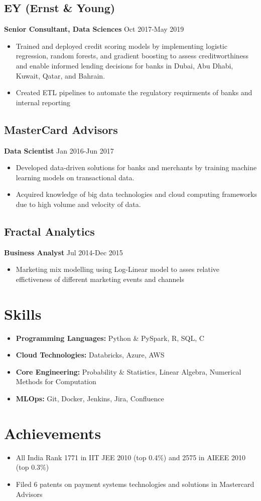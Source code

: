 \documentclass[a4paper,10pt]{article}
\begin{document}
\subsection*{EY (Ernst \& Young)}
\textbf{Senior Consultant, Data Sciences} \hfill Oct 2017-May 2019
\begin{itemize}[leftmargin=*]
    \item  Trained and deployed credit scoring models by implementing logistic regression, random forests, and gradient boosting to assess creditworthiness and enable informed lending decisions for banks in Dubai, Abu Dhabi, Kuwait, Qatar, and Bahrain.
    \item Created ETL pipelines to automate the regulatory requirments of banks and internal reporting 
\end{itemize}

\subsection*{MasterCard Advisors}
\textbf{Data Scientist} \hfill Jan 2016-Jun 2017
\begin{itemize}[leftmargin=*]
    \item Developed data-driven solutions for banks and merchants by training machine learning models on transactional data.
    \item Acquired knowledge of big data technologies and cloud computing frameworks due to high volume and velocity of data.
\end{itemize}

\subsection*{Fractal Analytics}
\textbf{Business Analyst} \hfill Jul 2014-Dec 2015
\begin{itemize}[leftmargin=*]
    \item Marketing mix modelling using Log-Linear model to asses relative effictiveness of different marketing events and channels  
\end{itemize}

\section*{Skills}
\begin{itemize}[leftmargin=*]
    \item \textbf{Programming Languages:} Python \& PySpark, R, SQL, C
    \item \textbf{Cloud Technologies:} Databricks, Azure, AWS
    \item \textbf{Core Engineering:} Probability \& Statistics, Linear Algebra, Numerical Methods for Computation
    \item \textbf{MLOps:} Git, Docker, Jenkins, Jira, Confluence
\end{itemize}

\section*{Achievements}
\begin{itemize}[leftmargin=*]
    \item All India Rank 1771 in IIT JEE 2010 (top 0.4\%) and 2575 in AIEEE 2010 (top 0.3\%)
    \item Filed 6 patents on payment systems technologies and solutions in Mastercard Advisors
\end{itemize}
\end{document}
